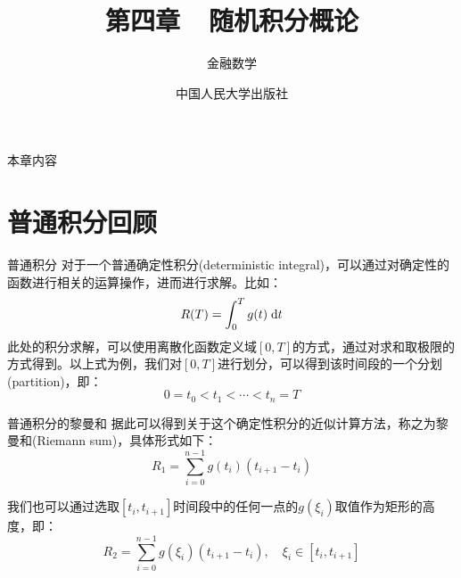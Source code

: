 \documentclass[t]{beamer}
\newcommand{\dif}{{\;\rm d}}
\begin{document}
\fontsize{11}{18}\selectfont


\CTEXindent



  \title{第四章~~随机积分概论}
\author{金融数学}
\date{中国人民大学出版社}
  \begin{frame}
    \maketitle
  \end{frame}



\begin{frame}{本章内容}


    \tableofcontents


\end{frame}


\section{普通积分回顾}
\begin{frame}{普通积分}
对于一个普通确定性积分(deterministic integral)，可以通过对确定性的函数进行相关的运算操作，进而进行求解。比如：
\begin{equation*}
R(T)=\int^T_0 g(t)\dif t 
\end{equation*}
此处的积分求解，可以使用离散化函数定义域$[0,T]$的方式，通过对求和取极限的方式得到。以上式为例，我们对$[0,T]$进行划分，可以得到该时间段的一个分划(partition)，即：
\[0=t_0< t_1< \cdots< t_n=T \]
\end{frame}


\begin{frame}{普通积分的黎曼和}
据此可以得到关于这个确定性积分的近似计算方法，称之为黎曼和(Riemann sum)，具体形式如下：
\[R_1= \sum^{n-1}_{i=0}g(t_{i})(t_{i+1}-t_{i}) \]

我们也可以通过选取$[t_i,t_{i+1}]$时间段中的任何一点的$g(\xi_i)$取值作为矩形的高度，即：
\[R_2= \sum^{n-1}_{i=0}g\left(\xi_i\right)(t_{i+1}-t_{i}), \quad \xi_i\in[t_i,t_{i+1}]\]
\end{frame}
\end{document}
